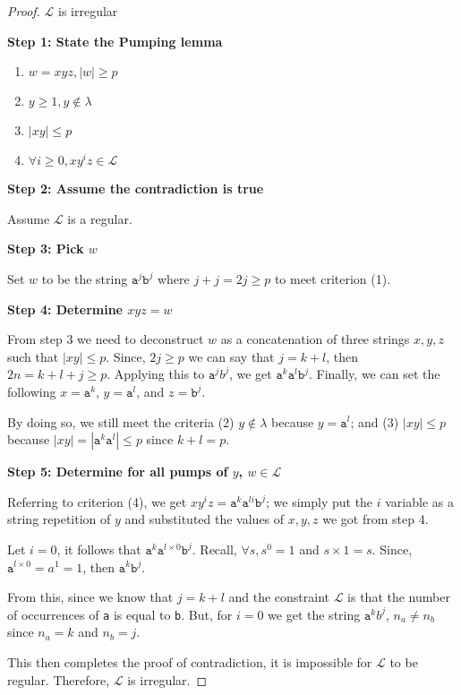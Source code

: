 \begin{proof}
    $\mathcal{L}$ is irregular

    \textbf{Step 1: State the Pumping lemma}
    \begin{enumerate}
        \item $w=xyz, |w| \geq p$
        \item $y\geq 1, y\notin\lambda$
        \item $|xy|\leq p$
        \item $\forall i\geq 0, xy^iz\in\mathcal{L}$
    \end{enumerate}
    
    \textbf{Step 2: Assume the contradiction is true}
    
    Assume $\mathcal{L}$ is a regular. 
    
    \textbf{Step 3: Pick $w$}
    
    Set $w$ to be the string $\texttt{a}^j \texttt{b}^j$ where $j+j=2j \geq p$ to meet criterion (1). 
    
    \textbf{Step 4: Determine $xyz=w$}
    
    From step 3 we need to deconstruct $w$ as a concatenation of three strings $x,y,z$ such that $|xy| \leq p$. Since, $2j\geq p$ we can say that $j=k+l$, then $2n=k+l+j \geq p$. Applying this to $\texttt{a}^jb^j$, we get $\texttt{a}^k \texttt{a}^l \texttt{b}^j$. Finally, we can set the following $x=\texttt{a}^k$, $y=\texttt{a}^l$, and $z=\texttt{b}^j$. 
    
    By doing so, we still meet the criteria (2) $y\notin \lambda$ because $y=\texttt{a}^l$; and (3) $|xy|\leq p$ because $|xy|=|\texttt{a}^k \texttt{a}^l|\leq p$ since $k+l=p$. 
    
    \textbf{Step 5: Determine for all pumps of $y$, $w\in \mathcal{L}$}
    
    Referring to criterion (4), we get $xy^iz = \texttt{a}^k \texttt{a}^{li} \texttt{b}^j$; we simply put the $i$ variable as a string repetition of $y$ and substituted the values of $x,y,z$ we got from step 4. 
    
    Let $i=0$, it follows that $\texttt{a}^k\texttt{a}^{l\times0}\texttt{b}^j$. Recall, $\forall s, s^0=1$ and $s\times1=s$. Since, $\texttt{a}^{l\times0}=a^1=1$, then $\texttt{a}^k\texttt{b}^j$. 
    
    From this, since we know that $j=k+l$ and the constraint $\mathcal{L}$ is that the number of occurrences of \texttt{a} is equal to \texttt{b}. But, for $i=0$ we get the string $\texttt{a}^k\textit{b}^j$, $n_a \neq n_b$ since $n_a = k$ and $n_b=j$. 
    
    This then completes the proof of contradiction, it is impossible for $\mathcal{L}$ to be regular. Therefore, $\mathcal{L}$ is irregular. 
\end{proof}
    
